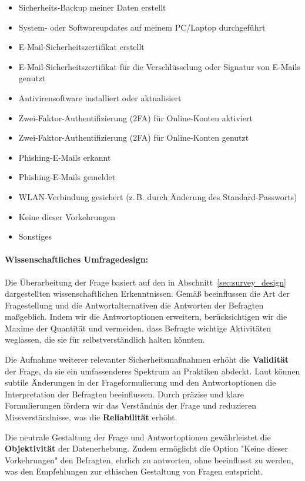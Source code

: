 \documentclass[german,report]{i1thesis}
\begin{document}
\begin{itemize}
    \item Sicherheits-Backup meiner Daten erstellt
    \item System- oder Softwareupdates auf meinem PC/Laptop durchgeführt
    \item E-Mail-Sicherheitszertifikat erstellt
    \item E-Mail-Sicherheitszertifikat für die Verschlüsselung oder Signatur von E-Mails genutzt
    \item Antivirensoftware installiert oder aktualisiert
    \item Zwei-Faktor-Authentifizierung (2FA) für Online-Konten aktiviert
    \item Zwei-Faktor-Authentifizierung (2FA) für Online-Konten genutzt
    \item Phishing-E-Mails erkannt
    \item Phishing-E-Mails gemeldet
    \item WLAN-Verbindung gesichert (z.\,B. durch Änderung des Standard-Passworts)
    \item Keine dieser Vorkehrungen
    \item Sonstiges
\end{itemize}

\paragraph{Wissenschaftliches Umfragedesign:}

Die Überarbeitung der Frage basiert auf den in Abschnitt~\ref{sec:survey_design} dargestellten wissenschaftlichen Erkenntnissen. Gemäß \citet{Schwarz1999} beeinflussen die Art der Fragestellung und die Antwortalternativen die Antworten der Befragten maßgeblich. Indem wir die Antwortoptionen erweitern, berücksichtigen wir die Maxime der Quantität und vermeiden, dass Befragte wichtige Aktivitäten weglassen, die sie für selbstverständlich halten könnten.

Die Aufnahme weiterer relevanter Sicherheitsmaßnahmen erhöht die \textbf{Validität} der Frage, da sie ein umfassenderes Spektrum an Praktiken abdeckt. Laut \citet{LucasBaird2006} können subtile Änderungen in der Frageformulierung und den Antwortoptionen die Interpretation der Befragten beeinflussen. Durch präzise und klare Formulierungen fördern wir das Verständnis der Frage und reduzieren Missverständnisse, was die \textbf{Reliabilität} erhöht.

Die neutrale Gestaltung der Frage und Antwortoptionen gewährleistet die \textbf{Objektivität} der Datenerhebung. Zudem ermöglicht die Option "Keine dieser Vorkehrungen" den Befragten, ehrlich zu antworten, ohne beeinflusst zu werden, was den Empfehlungen zur ethischen Gestaltung von Fragen entspricht.
\end{document}
